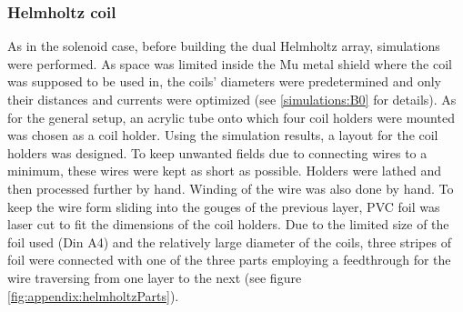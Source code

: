         \subsubsection{Helmholtz coil}
        \label{sec:matMeth:Helmholtz}
        As in the solenoid case, before building the dual Helmholtz array, simulations were performed.  As space was limited inside the Mu metal shield where the coil was supposed to be used in, the coils' diameters were predetermined and only their distances and currents were optimized (see \ref{simulations:B0} for details). As for the general setup, an acrylic tube onto which four coil holders were mounted was chosen as a coil holder. Using the simulation results, a layout for the coil holders was designed. To keep unwanted fields due to connecting wires to a minimum, these wires were kept as short as possible. Holders were lathed and then processed further by hand. Winding of the wire was also done by hand. To keep the wire form sliding into the gouges of the previous layer, PVC foil was laser cut to fit the dimensions of the coil holders. Due to the limited size of the foil used (Din A4) and the relatively large diameter of the coils, three stripes of foil were connected with one of the three parts employing a feedthrough for the wire traversing from one layer to the next (see figure \ref{fig:appendix:helmholtzParts}).
